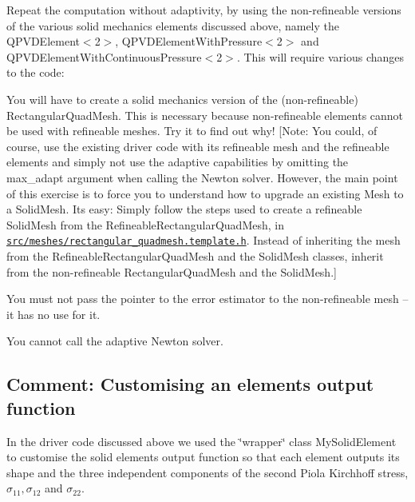 \begin{DoxyEnumerate}
\item Repeat the computation without adaptivity, by using the non-\/refineable versions of the various solid mechanics elements discussed above, namely the {\ttfamily Q\+P\+V\+D\+Element$<$2$>$}, {\ttfamily Q\+P\+V\+D\+Element\+With\+Pressure$<$2$>$} and {\ttfamily Q\+P\+V\+D\+Element\+With\+Continuous\+Pressure$<$2$>$}. This will require various changes to the code\+:
\begin{DoxyEnumerate}
\item You will have to create a solid mechanics version of the (non-\/refineable) {\ttfamily Rectangular\+Quad\+Mesh}. This is necessary because non-\/refineable elements cannot be used with refineable meshes. Try it to find out why! \mbox{[}Note\+: You could, of course, use the existing driver code with its refineable mesh and the refineable elements and simply not use the adaptive capabilities by omitting the {\ttfamily max\+\_\+adapt} argument when calling the Newton solver. However, the main point of this exercise is to force you to understand how to upgrade an existing {\ttfamily Mesh} to a {\ttfamily Solid\+Mesh}. It\textquotesingle{}s easy\+: Simply follow the steps used to create a refineable {\ttfamily Solid\+Mesh} from the {\ttfamily Refineable\+Rectangular\+Quad\+Mesh}, in \href{../../../../src/meshes/rectangular_quadmesh.template.h}{\tt src/meshes/rectangular\+\_\+quadmesh.\+template.\+h}. Instead of inheriting the mesh from the {\ttfamily Refineable\+Rectangular\+Quad\+Mesh} and the {\ttfamily Solid\+Mesh} classes, inherit from the non-\/refineable {\ttfamily Rectangular\+Quad\+Mesh} and the {\ttfamily Solid\+Mesh}.\mbox{]}
\item You must not pass the pointer to the error estimator to the non-\/refineable mesh -- it has no use for it.
\item You cannot call the adaptive Newton solver.
\end{DoxyEnumerate}
\end{DoxyEnumerate}

\hypertarget{index_com}{}\subsection{Comment\+: Customising an element\textquotesingle{}s output function}\label{index_com}
In the driver code discussed above we used the \char`\"{}wrapper\char`\"{} class {\ttfamily My\+Solid\+Element} to customise the solid elements\textquotesingle{} output function so that each element outputs its shape and the three independent components of the second Piola Kirchhoff stress, $ \sigma_{11}, \sigma_{12} $ and $ \sigma_{22}. $

